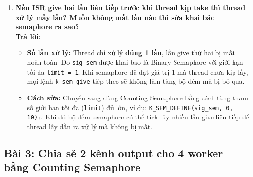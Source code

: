 \begin{enumerate}[label=(\alph*)]
    \item \textbf{Nếu ISR give hai lần liên tiếp trước khi thread kịp take thì thread xử lý mấy lần? Muốn không mất lần nào thì sửa khai báo semaphore ra sao?} \\
    \textbf{Trả lời:}
    \begin{itemize}
        \item \textbf{Số lần xử lý:} Thread chỉ xử lý \textbf{đúng 1 lần}, lần give thứ hai bị mất hoàn toàn. Do \texttt{sig\_sem} được khai báo là Binary Semaphore với giới hạn tối đa \texttt{limit = 1}. Khi semaphore đã đạt giá trị 1 mà thread chưa kịp lấy, mọi lệnh \texttt{k\_sem\_give} tiếp theo sẽ không làm tăng bộ đếm mà bị bỏ qua.
        \item \textbf{Cách sửa:} Chuyển sang dùng Counting Semaphore bằng cách tăng tham số giới hạn tối đa (\texttt{limit}) đủ lớn, ví dụ: \texttt{K\_SEM\_DEFINE(sig\_sem, 0, 10);}. Khi đó bộ đếm semaphore có thể tích lũy nhiều lần give liên tiếp để thread lấy dần ra xử lý mà không bị mất.
    \end{itemize}
\end{enumerate}

\subsection{Bài 3: Chia sẻ 2 kênh output cho 4 worker bằng Counting Semaphore}

